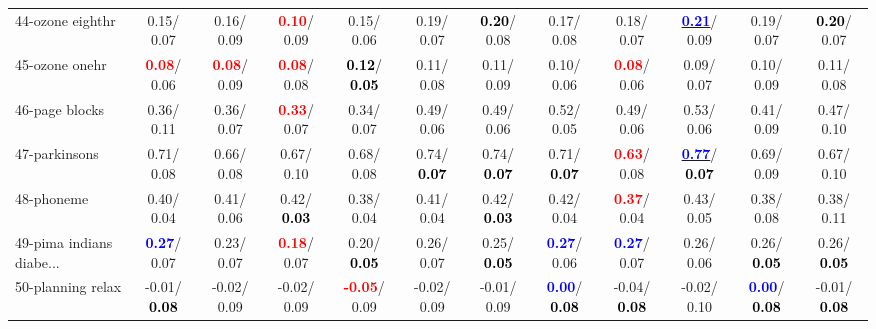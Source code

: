 \begin{table}[h]
\begin{center}
{\begin{tabular}{lc|c|c|c|c|c|c|c|c|c|c}
44-ozone eighthr &   0.15/  0.07 &   0.16/  0.09 & \textcolor{red}{\textbf{  0.10}}/  0.09 &   0.15/  0.06 &   0.19/  0.07 & \textcolor{black}{\textbf{  0.20}}/  0.08 &   0.17/  0.08 &   0.18/  0.07 & \underline{\textcolor{blue}{\textbf{  0.21}}}/  0.09 &   0.19/  0.07 & \textcolor{black}{\textbf{  0.20}}/  0.07 \\
45-ozone onehr & \textcolor{red}{\textbf{  0.08}}/  0.06 & \textcolor{red}{\textbf{  0.08}}/  0.09 & \textcolor{red}{\textbf{  0.08}}/  0.08 & \textcolor{black}{\textbf{  0.12}}/\textcolor{black}{\textbf{  0.05}} &   0.11/  0.08 &   0.11/  0.09 &   0.10/  0.06 & \textcolor{red}{\textbf{  0.08}}/  0.06 &   0.09/  0.07 &   0.10/  0.09 &   0.11/  0.08 \\
46-page blocks &   0.36/  0.11 &   0.36/  0.07 & \textcolor{red}{\textbf{  0.33}}/  0.07 &   0.34/  0.07 &   0.49/  0.06 &   0.49/  0.06 &   0.52/  0.05 &   0.49/  0.06 &   0.53/  0.06 &   0.41/  0.09 &   0.47/  0.10 \\ \hline
47-parkinsons &   0.71/  0.08 &   0.66/  0.08 &   0.67/  0.10 &   0.68/  0.08 &   0.74/\textcolor{black}{\textbf{  0.07}} &   0.74/\textcolor{black}{\textbf{  0.07}} &   0.71/\textcolor{black}{\textbf{  0.07}} & \textcolor{red}{\textbf{  0.63}}/  0.08 & \underline{\textcolor{blue}{\textbf{  0.77}}}/\textcolor{black}{\textbf{  0.07}} &   0.69/  0.09 &   0.67/  0.10 \\
48-phoneme &   0.40/  0.04 &   0.41/  0.06 &   0.42/\textcolor{black}{\textbf{  0.03}} &   0.38/  0.04 &   0.41/  0.04 &   0.42/\textcolor{black}{\textbf{  0.03}} &   0.42/  0.04 & \textcolor{red}{\textbf{  0.37}}/  0.04 &   0.43/  0.05 &   0.38/  0.08 &   0.38/  0.11 \\
49-pima indians diabe... & \textcolor{blue}{\textbf{  0.27}}/  0.07 &   0.23/  0.07 & \textcolor{red}{\textbf{  0.18}}/  0.07 &   0.20/\textcolor{black}{\textbf{  0.05}} &   0.26/  0.07 &   0.25/\textcolor{black}{\textbf{  0.05}} & \textcolor{blue}{\textbf{  0.27}}/  0.06 & \textcolor{blue}{\textbf{  0.27}}/  0.07 &   0.26/  0.06 &   0.26/\textcolor{black}{\textbf{  0.05}} &   0.26/\textcolor{black}{\textbf{  0.05}} \\
50-planning relax &  -0.01/\textcolor{black}{\textbf{  0.08}} &  -0.02/  0.09 &  -0.02/  0.09 & \textcolor{red}{\textbf{ -0.05}}/  0.09 &  -0.02/  0.09 &  -0.01/  0.09 & \textcolor{blue}{\textbf{  0.00}}/\textcolor{black}{\textbf{  0.08}} &  -0.04/\textcolor{black}{\textbf{  0.08}} &  -0.02/  0.10 & \textcolor{blue}{\textbf{  0.00}}/\textcolor{black}{\textbf{  0.08}} &  -0.01/\textcolor{black}{\textbf{  0.08}} \\

\end{tabular}}
\end{center}
\end{table}
